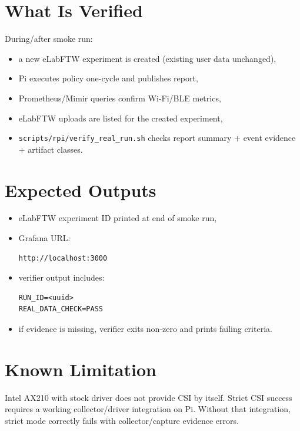 \documentclass[11pt,a4paper]{article}
\begin{document}
\section{What Is Verified}
During/after smoke run:
\begin{itemize}
  \item a new eLabFTW experiment is created (existing user data unchanged),
  \item Pi executes policy one-cycle and publishes report,
  \item Prometheus/Mimir queries confirm Wi-Fi/BLE metrics,
  \item eLabFTW uploads are listed for the created experiment,
  \item \texttt{scripts/rpi/verify\_real\_run.sh} checks report summary + event evidence + artifact classes.
\end{itemize}

\section{Expected Outputs}
\begin{itemize}
  \item eLabFTW experiment ID printed at end of smoke run,
  \item Grafana URL:
\begin{verbatim}
http://localhost:3000
\end{verbatim}
  \item verifier output includes:
\begin{verbatim}
RUN_ID=<uuid>
REAL_DATA_CHECK=PASS
\end{verbatim}
  \item if evidence is missing, verifier exits non-zero and prints failing criteria.
\end{itemize}

\section{Known Limitation}
Intel AX210 with stock driver does not provide CSI by itself.
Strict CSI success requires a working collector/driver integration on Pi.
Without that integration, strict mode correctly fails with collector/capture evidence errors.
\end{document}
